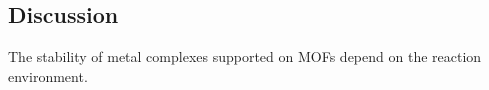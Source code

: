 \documentclass[journal=jctcce,manuscript=article]{achemso}
\begin{document}

\newpage
\subsection{Discussion}
The stability of metal complexes supported on MOFs depend on the reaction environment. 

\end{document}
